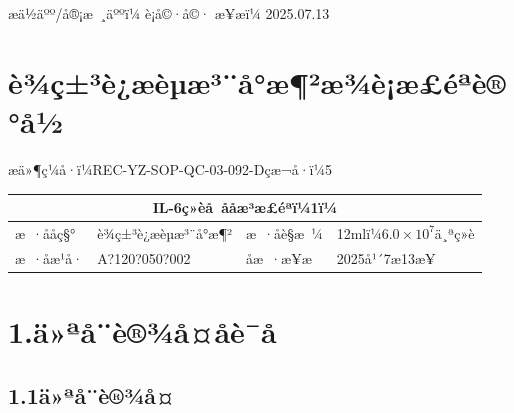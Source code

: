 \documentclass[UTF8,10pt,a4paper,fontset=fandol]{ctexart}
\newcommand{\fieldvalue}[1]{#1}
\newcommand{\handwritten}[1]{#1}
\begin{document}
\vfill

\noindent
æä½äºº/å®¡æ ¸äººï¼
\fieldvalue{\handwritten{è¡å©·å©·}}
\hfill
æ¥æï¼
\fieldvalue{\handwritten{2025.07.13}}

\newpage

\section*{è¾ç±³è¿æèµæ³¨å°æ¶²æ¾è¡æ£éªè®°å½}

\begin{center}
æä»¶ç¼å·ï¼REC-YZ-SOP-QC-03-092-{}D\qquad çæ¬å·ï¼5
\end{center}

\begin{center}
\begin{tabular}{|p{3cm}|p{5cm}|p{3cm}|p{5cm}|}
\hline
\multicolumn{4}{|c|}{\textbf{IL-6ç»èå å­åæ³æ£éªï¼1ï¼}}\\
\hline
æ ·ååç§° &
\fieldvalue{è¾ç±³è¿æèµæ³¨å°æ¶²} &
æ ·åè§æ ¼ &
\fieldvalue{12mlï¼$6.0\times10^{7}$ä¸ªç»è}\\
\hline
æ ·åæ¹å· &
\fieldvalue{\handwritten{A?120?050?002}} &
åæ ·æ¥æ &
\fieldvalue{\handwritten{2025å¹´7æ13æ¥}}\\
\hline
\end{tabular}
\end{center}

\section*{1.\quad ä»ªå¨è®¾å¤åè¯å}

\subsection*{1.1\quad ä»ªå¨è®¾å¤}
\end{document}
